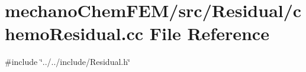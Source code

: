 \section{mechano\+Chem\+F\+E\+M/src/\+Residual/chemo\+Residual.cc File Reference}
\label{chemo_residual_8cc}
{\ttfamily \#include \char`\"{}../../include/\+Residual.\+h\char`\"{}}\newline

